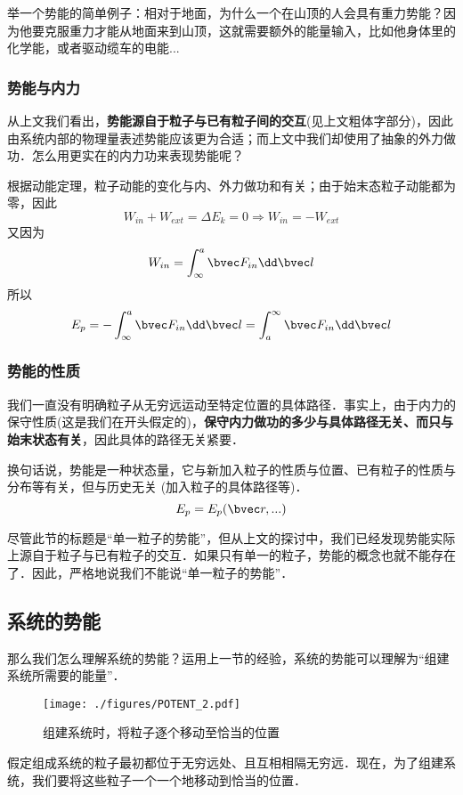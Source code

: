 举一个势能的简单例子：相对于地面，为什么一个在山顶的人会具有重力势能？因为他要克服重力才能从地面来到山顶，这就需要额外的能量输入，比如他身体里的化学能，或者驱动缆车的电能...

\subsubsection{势能与内力}
从上文我们看出，\textbf{势能源自于粒子与已有粒子间的交互}(见上文粗体字部分)，因此由系统内部的物理量表述势能应该更为合适；而上文中我们却使用了抽象的外力做功．怎么用更实在的内力功来表现势能呢？

根据动能定理，粒子动能的变化与内、外力做功和有关；由于始末态粒子动能都为零，因此
$$W_{in} + W_{ext} = \Delta E_k = 0 \Rightarrow W_{in} = -W_{ext}$$
又因为
$$W_{in} = \int^a_\infty \bvec F_{in} \dd \bvec l $$
所以
$$E_p = - \int^a_\infty \bvec F_{in} \dd \bvec l = \int^\infty_a \bvec F_{in} \dd \bvec l$$

\subsubsection{势能的性质}
我们一直没有明确粒子从无穷远运动至特定位置的具体路径．事实上，由于内力的保守性质(这是我们在开头假定的)，\textbf{保守内力做功的多少与具体路径无关、而只与始末状态有关}，因此具体的路径无关紧要．%

换句话说，势能是一种状态量，它与新加入粒子的性质与位置、已有粒子的性质与分布等有关，但与历史无关 (加入粒子的具体路径等)．
$$E_p=E_p(\bvec r,...)$$

尽管此节的标题是“单一粒子的势能”，但从上文的探讨中，我们已经发现势能实际上源自于粒子与已有粒子的交互．如果只有单一的粒子，势能的概念也就不能存在了．因此，严格地说我们不能说“单一粒子的势能”．

\subsection{系统的势能}
那么我们怎么理解系统的势能？运用上一节的经验，系统的势能可以理解为“组建系统所需要的能量”．

\begin{figure}[ht]
\centering
\texttt{[image: ./figures/POTENT\_2.pdf]}
\caption{组建系统时，将粒子逐个移动至恰当的位置} \label{POTENT_fig2}
\end{figure}
假定组成系统的粒子最初都位于无穷远处、且互相相隔无穷远．现在，为了组建系统，我们要将这些粒子一个一个地移动到恰当的位置．

